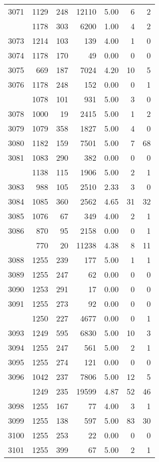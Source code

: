 \documentclass[
]{article}
\begin{document}
\begin{table}
\begin{tabular}[t]{lrrrrrr}
3071 & 1129 & 248 & 12110 & 5.00 & 6 & 2\\
\addlinespace
3072 & 1178 & 303 & 6200 & 1.00 & 4 & 2\\
3073 & 1214 & 103 & 139 & 4.00 & 1 & 0\\
3074 & 1178 & 170 & 49 & 0.00 & 0 & 0\\
3075 & 669 & 187 & 7024 & 4.20 & 10 & 5\\
3076 & 1178 & 248 & 152 & 0.00 & 0 & 1\\
\addlinespace
3077 & 1078 & 101 & 931 & 5.00 & 3 & 0\\
3078 & 1000 & 19 & 2415 & 5.00 & 1 & 2\\
3079 & 1079 & 358 & 1827 & 5.00 & 4 & 0\\
3080 & 1182 & 159 & 7501 & 5.00 & 7 & 68\\
3081 & 1083 & 290 & 382 & 0.00 & 0 & 0\\
\addlinespace
3082 & 1138 & 115 & 1906 & 5.00 & 2 & 1\\
3083 & 988 & 105 & 2510 & 2.33 & 3 & 0\\
3084 & 1085 & 360 & 2562 & 4.65 & 31 & 32\\
3085 & 1076 & 67 & 349 & 4.00 & 2 & 1\\
3086 & 870 & 95 & 2158 & 0.00 & 0 & 1\\
\addlinespace
3087 & 770 & 20 & 11238 & 4.38 & 8 & 11\\
3088 & 1255 & 239 & 177 & 5.00 & 1 & 1\\
3089 & 1255 & 247 & 62 & 0.00 & 0 & 0\\
3090 & 1253 & 291 & 17 & 0.00 & 0 & 0\\
3091 & 1255 & 273 & 92 & 0.00 & 0 & 0\\
\addlinespace
3092 & 1250 & 227 & 4677 & 0.00 & 0 & 1\\
3093 & 1249 & 595 & 6830 & 5.00 & 10 & 3\\
3094 & 1255 & 247 & 561 & 5.00 & 2 & 1\\
3095 & 1255 & 274 & 121 & 0.00 & 0 & 0\\
3096 & 1042 & 237 & 7806 & 5.00 & 12 & 5\\
\addlinespace
3097 & 1249 & 235 & 19599 & 4.87 & 52 & 46\\
3098 & 1255 & 167 & 77 & 4.00 & 3 & 1\\
3099 & 1255 & 138 & 597 & 5.00 & 83 & 30\\
3100 & 1255 & 253 & 22 & 0.00 & 0 & 0\\
3101 & 1255 & 399 & 67 & 5.00 & 2 & 1\\

\end{tabular}
\end{table}
\end{document}
